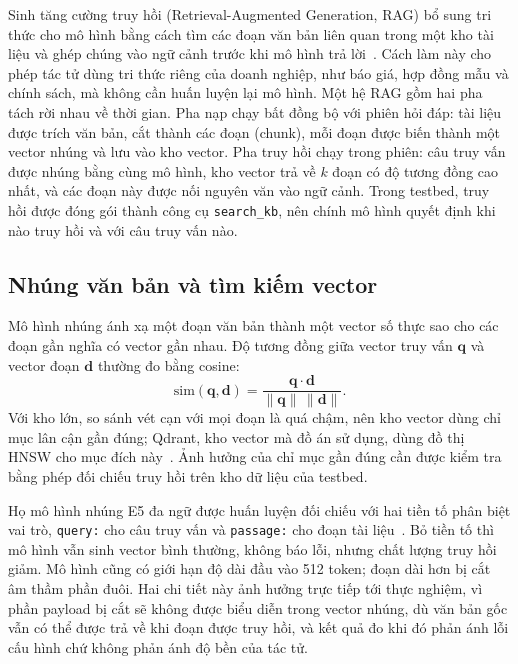 \documentclass[../DoAn.tex]{subfiles}
\begin{document}
Sinh tăng cường truy hồi (Retrieval-Augmented Generation, RAG) bổ sung tri thức cho mô hình bằng cách tìm các đoạn văn bản liên quan trong một kho tài liệu và ghép chúng vào ngữ cảnh trước khi mô hình trả lời~\cite{lewis2020rag}. Cách làm này cho phép tác tử dùng tri thức riêng của doanh nghiệp, như báo giá, hợp đồng mẫu và chính sách, mà không cần huấn luyện lại mô hình. Một hệ RAG gồm hai pha tách rời nhau về thời gian. Pha nạp chạy bất đồng bộ với phiên hỏi đáp: tài liệu được trích văn bản, cắt thành các đoạn (chunk), mỗi đoạn được biến thành một vector nhúng và lưu vào kho vector. Pha truy hồi chạy trong phiên: câu truy vấn được nhúng bằng cùng mô hình, kho vector trả về $k$ đoạn có độ tương đồng cao nhất, và các đoạn này được nối nguyên văn vào ngữ cảnh. Trong testbed, truy hồi được đóng gói thành công cụ \texttt{search\_kb}, nên chính mô hình quyết định khi nào truy hồi và với câu truy vấn nào.

\subsection{Nhúng văn bản và tìm kiếm vector}
\label{subsection:3.2.2}

Mô hình nhúng ánh xạ một đoạn văn bản thành một vector số thực sao cho các đoạn gần nghĩa có vector gần nhau. Độ tương đồng giữa vector truy vấn $\mathbf{q}$ và vector đoạn $\mathbf{d}$ thường đo bằng cosine:
\begin{equation}
	\mathrm{sim}(\mathbf{q},\mathbf{d}) = \frac{\mathbf{q}\cdot\mathbf{d}}{\lVert\mathbf{q}\rVert\,\lVert\mathbf{d}\rVert}.
	\label{eq:cosine}
\end{equation}
Với kho lớn, so sánh vét cạn với mọi đoạn là quá chậm, nên kho vector dùng chỉ mục lân cận gần đúng; Qdrant, kho vector mà đồ án sử dụng, dùng đồ thị HNSW cho mục đích này~\cite{qdrant}. Ảnh hưởng của chỉ mục gần đúng cần được kiểm tra bằng phép đối chiếu truy hồi trên kho dữ liệu của testbed.

Họ mô hình nhúng E5 đa ngữ được huấn luyện đối chiếu với hai tiền tố phân biệt vai trò, \texttt{query:} cho câu truy vấn và \texttt{passage:} cho đoạn tài liệu~\cite{wang2024e5}. Bỏ tiền tố thì mô hình vẫn sinh vector bình thường, không báo lỗi, nhưng chất lượng truy hồi giảm. Mô hình cũng có giới hạn độ dài đầu vào 512 token; đoạn dài hơn bị cắt âm thầm phần đuôi. Hai chi tiết này ảnh hưởng trực tiếp tới thực nghiệm, vì phần payload bị cắt sẽ không được biểu diễn trong vector nhúng, dù văn bản gốc vẫn có thể được trả về khi đoạn được truy hồi, và kết quả đo khi đó phản ánh lỗi cấu hình chứ không phản ánh độ bền của tác tử.
\end{document}
